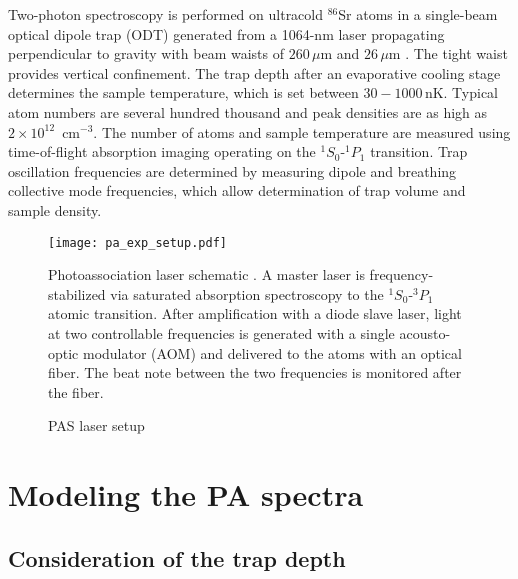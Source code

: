 Two-photon spectroscopy is performed on ultracold $^{86}$Sr atoms in a single-beam optical dipole trap (ODT) generated from a 1064-nm laser propagating perpendicular to gravity with beam waists of $260$\,$\mu$m and $26$\,$\mu$m \cite{mmp08,ssk14}. The tight waist provides vertical confinement. The trap depth after an evaporative cooling stage determines the sample temperature, which is set between $30-1000$\,nK. Typical atom numbers are several hundred thousand and peak densities are as high as $2\times 10^{12}$\, cm$^{-3}$. The number of atoms and sample temperature are measured using time-of-flight absorption imaging operating on the $^1S_0$-$^1P_1$ transition. Trap oscillation frequencies are determined by measuring dipole and breathing collective mode frequencies, which allow determination of trap volume and sample density.




\begin{figure} \label{Experimental Setup}
\centerline{
  \texttt{[image: pa\_exp\_setup.pdf]}}
  \caption{PAS laser setup}{Photoassociation laser schematic . A master laser is frequency-stabilized via saturated absorption spectroscopy to the $^1S_0$-$^3P_1$ atomic transition. After amplification with a diode slave laser, light at two controllable frequencies is generated with a single acousto-optic modulator (AOM) and delivered to the atoms with an optical fiber. The beat note between the two frequencies is monitored after the fiber.}  
\end{figure}





\section{Modeling the PA spectra} \label{sec:lowE_theory}
\subsection{Consideration of the trap depth}
\label{sec:trunc_trap}


